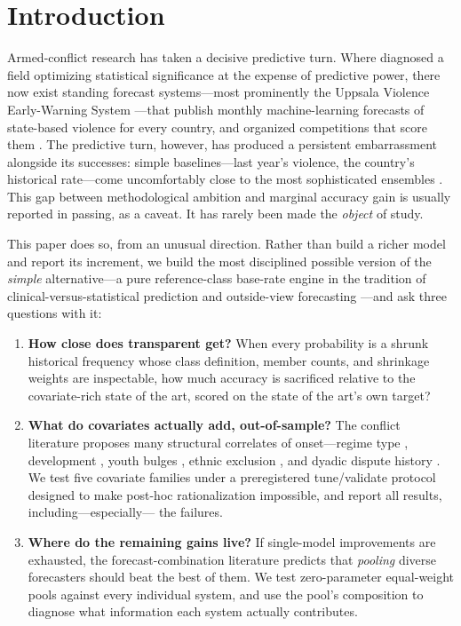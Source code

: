 \documentclass[11pt]{article}
\begin{document}
\section{Introduction}\label{sec:intro}

Armed-conflict research has taken a decisive predictive turn. Where
\citet{ward2010perils} diagnosed a field optimizing statistical significance
at the expense of predictive power, there now exist standing forecast
systems---most prominently the Uppsala Violence Early-Warning System
\citep[VIEWS;][]{hegre2019views}---that publish monthly machine-learning
forecasts of state-based violence for every country, and organized
competitions that score them \citep{hegre2022lessons,vesco2022united}. The
predictive turn, however, has produced a persistent embarrassment alongside
its successes: simple baselines---last year's violence, the country's
historical rate---come uncomfortably close to the most sophisticated
ensembles \citep{cederman2017predicting,chadefaux2017limits}. This gap
between methodological ambition and marginal accuracy gain is usually
reported in passing, as a caveat. It has rarely been made the \emph{object}
of study.

This paper does so, from an unusual direction. Rather than build a richer
model and report its increment, we build the most disciplined possible
version of the \emph{simple} alternative---a pure reference-class base-rate
engine in the tradition of clinical-versus-statistical prediction
\citep{meehl1954clinical,dawes1979robust} and outside-view forecasting
\citep{kahneman1993timid}---and ask three questions with it:

\begin{enumerate}
\item \textbf{How close does transparent get?} When every probability is a
shrunk historical frequency whose class definition, member counts, and
shrinkage weights are inspectable, how much accuracy is sacrificed relative
to the covariate-rich state of the art, scored on the state of the art's own
target?
\item \textbf{What do covariates actually add, out-of-sample?} The conflict
literature proposes many structural correlates of onset---regime type
\citep{goldstone2010global}, development
\citep{fearon2003ethnicity,collier2004greed}, youth bulges
\citep{urdal2006clash}, ethnic exclusion \citep{cederman2010why}, and dyadic
dispute history \citep{maoz2019dyadic}. We test five covariate families under
a preregistered tune/validate protocol designed to make post-hoc
rationalization impossible, and report all results, including---especially---
the failures.
\item \textbf{Where do the remaining gains live?} If single-model
improvements are exhausted, the forecast-combination literature
\citep{bates1969combination,clemen1989combining,timmermann2006forecast}
predicts that \emph{pooling} diverse forecasters should beat the best of
them. We test zero-parameter equal-weight pools against every individual
system, and use the pool's composition to diagnose what information each
system actually contributes.
\end{enumerate}
\end{document}

